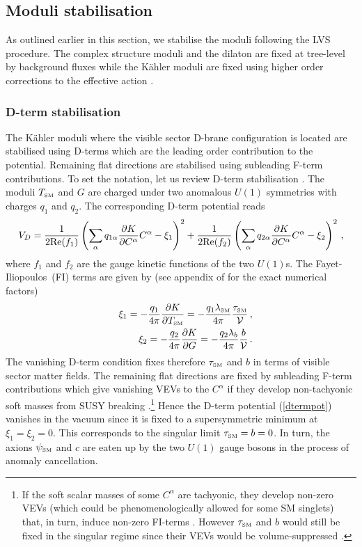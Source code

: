 \documentclass[11pt,a4paper]{article}
\newcommand{\be}{\begin{equation}}
\newcommand{\ee}{\end{equation}}
\def\SM{{\scriptscriptstyle \rm SM}}
\newcommand\vo{{\mathcal{V}}}
\begin{document}
\subsection{Moduli stabilisation}

As outlined earlier in this section, we stabilise the moduli following the LVS procedure.
The complex structure moduli and the dilaton are fixed at tree-level by background fluxes while the K\"ahler moduli are fixed using higher order corrections to the effective action \cite{Cicoli:2013cha}.


\subsubsection{D-term stabilisation}
\label{shrink}

The K\"ahler moduli where the visible sector D-brane configuration is located are stabilised using D-terms which are the leading order contribution to the potential. Remaining flat directions are stabilised using subleading F-term contributions. To set the notation, let us review D-term stabilisation \cite{Cicoli:2012vw}. The moduli $T_\SM$ and $G$ are charged under two anomalous $U(1)$ symmetries with charges $q_1$ and $q_2$. The corresponding D-term potential reads
\be
V_D = \frac{1}{2{\rm Re}(f_1)} \left(\sum_\alpha q_{1 \alpha} \frac{\partial K}{\partial C^\alpha} C^\alpha - \xi_1\right)^2
+ \frac{1}{2{\rm Re}(f_2)} \left(\sum_\alpha q_{2 \alpha} \frac{\partial K}{\partial C^\alpha} C^\alpha - \xi_2\right)^2\,,
\label{dtermpot}
\ee
where $f_1$ and $f_2$ are the gauge kinetic functions of the two $U(1)$s.
The Fayet-Iliopoulos~(FI) terms are given by (see appendix of \cite{Cicoli:2011yh} for the exact numerical factors)
\begin{eqnarray}
&& \xi_1 = - \frac{q_1}{4\pi} \frac{\partial K}{\partial T_\SM} = - \frac{q_1  \lambda_\SM}{4\pi} \frac{\tau_\SM}{\vo}\,, \label{xiSM} \\
&& \xi_2 = - \frac{q_2}{4\pi} \frac{\partial K}{\partial G} = - \frac{q_2 \lambda_b}{4\pi} \frac{b}{\vo}\, .
\end{eqnarray}
The vanishing D-term condition fixes therefore $\tau_\SM$ and $b$ in terms of visible sector matter fields.
The remaining flat directions are fixed by subleading F-term contributions which give vanishing VEVs to the $C^\alpha$ if they develop non-tachyonic soft masses from SUSY breaking \cite{Cicoli:2012vw}.\footnote{If the soft scalar masses of some $C^\alpha$ are tachyonic,
they develop non-zero VEVs (which could be phenomenologically allowed for some SM singlets) that, in turn, induce non-zero FI-terms \cite{Cicoli:2013cha}.
However $\tau_\SM$ and $b$ would still be fixed in the singular regime since their VEVs would be volume-suppressed \cite{Cicoli:2013cha}.}
Hence the D-term potential (\ref{dtermpot}) vanishes in the vacuum since it is fixed to a supersymmetric minimum at $\xi_1 = \xi_2 = 0$. This corresponds to the singular limit $\tau_\SM = b = 0$. In turn, the axions $\psi_\SM$ and $c$ are eaten up by the two $U(1)$ gauge bosons in the process of anomaly cancellation.
\end{document}
